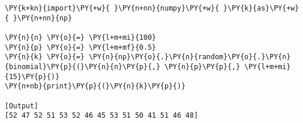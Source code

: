 \begin{Verbatim}[label=\makebox{\href{https://github.com/unipi-physics-labs/statnotes/tree/main/snippy/np.random.binomial.py}{https://github.com/.../np.random.binomial.py}},commandchars=\\\{\}]
\PY{k+kn}{import}\PY{+w}{ }\PY{n+nn}{numpy}\PY{+w}{ }\PY{k}{as}\PY{+w}{ }\PY{n+nn}{np}

\PY{n}{n} \PY{o}{=} \PY{l+m+mi}{100}
\PY{n}{p} \PY{o}{=} \PY{l+m+mf}{0.5}
\PY{n}{k} \PY{o}{=} \PY{n}{np}\PY{o}{.}\PY{n}{random}\PY{o}{.}\PY{n}{binomial}\PY{p}{(}\PY{n}{n}\PY{p}{,} \PY{n}{p}\PY{p}{,} \PY{l+m+mi}{15}\PY{p}{)}
\PY{n+nb}{print}\PY{p}{(}\PY{n}{k}\PY{p}{)}

[Output]
[52 47 52 51 53 52 46 45 53 51 50 41 51 46 48]
\end{Verbatim}
